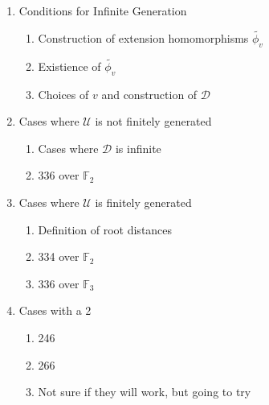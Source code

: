 \documentclass[12pt]{article}
\newcommand{\U}{\ensuremath{\mathcal{U}}}
\begin{document}
\begin{enumerate}
	\item Conditions for Infinite Generation
		\begin{enumerate}
			\item Construction of extension homomorphisms $\tilde{\phi_v}$
			\item Existience of $\tilde{\phi_v}$
			\item Choices of $v$ and construction of $\mathcal{D}$
		\end{enumerate}

	\item Cases where $\U$ is not finitely generated
		\begin{enumerate}
			\item Cases where $\mathcal{D}$ is infinite
			\item 336 over $\mathbb{F}_2$
		\end{enumerate}

	\item Cases where $\U$ is finitely generated
		\begin{enumerate}
			\item Definition of root distances
			\item 334 over $\mathbb{F}_2$
			\item 336 over $\mathbb{F}_3$
		\end{enumerate}

	\item Cases with a 2
		\begin{enumerate}
			\item 246
			\item 266
			\item Not sure if they will work, but going to try
		\end{enumerate}
\end{enumerate}
\end{document}
